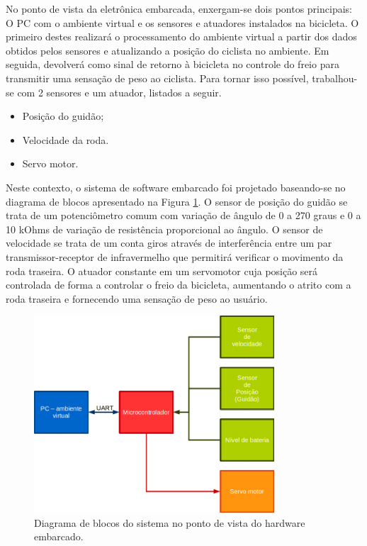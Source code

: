 No ponto de vista da eletrônica embarcada, enxergam-se dois pontos principais: O PC com o ambiente virtual e os sensores e atuadores instalados na bicicleta. O primeiro destes realizará o processamento do ambiente virtual a partir dos dados obtidos pelos sensores e atualizando a posição do ciclista no ambiente. Em seguida, devolverá como sinal de retorno à bicicleta no controle do freio para transmitir uma sensação de peso ao ciclista. Para tornar isso possível, trabalhou-se com 2 sensores e um atuador, listados a seguir.


\begin {itemize}
	\item Posição do guidão;
	\item Velocidade da roda.
	\item Servo motor.
\end  {itemize}

Neste contexto, o sistema de software embarcado foi projetado baseando-se no diagrama de blocos apresentado na Figura \ref{blocos}. O sensor de posição do guidão se trata de um potenciômetro comum com variação de ângulo de 0 a 270 graus e 0 a 10 kOhms de variação de resistência proporcional ao ângulo. O sensor de velocidade se trata de um conta giros através de interferência entre um par transmissor-receptor de infravermelho que permitirá verificar o movimento da roda traseira. O atuador constante em um servomotor cuja posição será controlada de forma a controlar o freio da bicicleta, aumentando o atrito com a roda traseira e fornecendo uma sensação de peso ao usuário.

\begin{figure}[h]
  \centering
  \includegraphics[width=0.8\textwidth]
      {figuras/diag_blocos_elet1.png}
  \caption{Diagrama de blocos do sistema no ponto de vista do hardware embarcado.}
  \label{blocos}
\end{figure}

